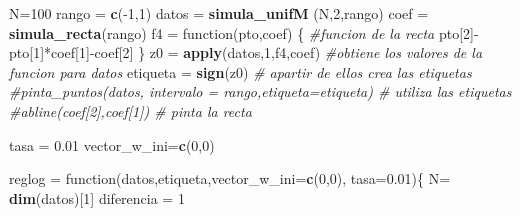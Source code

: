 \documentclass[]{article}
\newenvironment{Shaded}{\begin{snugshade}}{\end{snugshade}}
\newcommand{\KeywordTok}[1]{\textcolor[rgb]{0.13,0.29,0.53}{\textbf{{#1}}}}
\newcommand{\DataTypeTok}[1]{\textcolor[rgb]{0.13,0.29,0.53}{{#1}}}
\newcommand{\DecValTok}[1]{\textcolor[rgb]{0.00,0.00,0.81}{{#1}}}
\newcommand{\FloatTok}[1]{\textcolor[rgb]{0.00,0.00,0.81}{{#1}}}
\newcommand{\StringTok}[1]{\textcolor[rgb]{0.31,0.60,0.02}{{#1}}}
\newcommand{\CommentTok}[1]{\textcolor[rgb]{0.56,0.35,0.01}{\textit{{#1}}}}
\newcommand{\NormalTok}[1]{{#1}}
\begin{document}
\begin{Shaded}
\begin{Highlighting}[]
\NormalTok{N=}\DecValTok{100}
\NormalTok{rango =}\StringTok{ }\KeywordTok{c}\NormalTok{(-}\DecValTok{1}\NormalTok{,}\DecValTok{1}\NormalTok{)}
\NormalTok{datos =}\StringTok{ }\KeywordTok{simula_unifM} \NormalTok{(N,}\DecValTok{2}\NormalTok{,rango)}
\NormalTok{coef =}\StringTok{ }\KeywordTok{simula_recta}\NormalTok{(rango) }
\NormalTok{f4 =}\StringTok{ }\NormalTok{function(pto,coef) \{          }\CommentTok{#funcion de la recta}
  \NormalTok{pto[}\DecValTok{2}\NormalTok{]-pto[}\DecValTok{1}\NormalTok{]*coef[}\DecValTok{1}\NormalTok{]-coef[}\DecValTok{2}\NormalTok{]}
\NormalTok{\}}
\NormalTok{z0 =}\StringTok{ }\KeywordTok{apply}\NormalTok{(datos,}\DecValTok{1}\NormalTok{,f4,coef)        }\CommentTok{#obtiene los valores de la funcion para datos}
\NormalTok{etiqueta =}\StringTok{ }\KeywordTok{sign}\NormalTok{(z0)                }\CommentTok{# apartir de ellos crea las etiquetas}
\CommentTok{#pinta_puntos(datos, intervalo = rango,etiqueta=etiqueta) # utiliza las etiquetas }
\CommentTok{#abline(coef[2],coef[1])            # pinta la recta}


\NormalTok{tasa =}\StringTok{ }\FloatTok{0.01}
\NormalTok{vector_w_ini=}\KeywordTok{c}\NormalTok{(}\DecValTok{0}\NormalTok{,}\DecValTok{0}\NormalTok{) }

\NormalTok{reglog =}\StringTok{ }\NormalTok{function(datos,etiqueta,}\DataTypeTok{vector_w_ini=}\KeywordTok{c}\NormalTok{(}\DecValTok{0}\NormalTok{,}\DecValTok{0}\NormalTok{), }\DataTypeTok{tasa=}\FloatTok{0.01}\NormalTok{)\{}
  \NormalTok{N=}\StringTok{ }\KeywordTok{dim}\NormalTok{(datos)[}\DecValTok{1}\NormalTok{]}
  \NormalTok{diferencia =}\StringTok{ }\DecValTok{1}


\end{Highlighting}
\end{Shaded}
\end{document}
